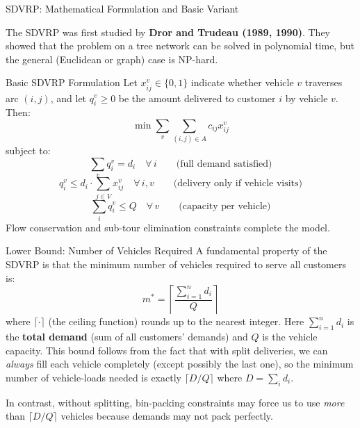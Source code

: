 \documentclass[aspectratio=169,10pt]{beamer}
\begin{document}
\begin{frame}[allowframebreaks]{SDVRP: Mathematical Formulation and Basic Variant}

The SDVRP was first studied by \textbf{Dror and Trudeau (1989, 1990)}.
They showed that the problem on a tree network can be solved in polynomial
time, but the general (Euclidean or graph) case is NP-hard.

\begin{block}{Basic SDVRP Formulation}
  Let $x_{ij}^v \in \{0,1\}$ indicate whether vehicle $v$ traverses arc
  $(i,j)$, and let $q_i^v \geq 0$ be the amount delivered to customer $i$
  by vehicle $v$.  Then:
  \[
    \min \sum_v \sum_{(i,j)\in A} c_{ij} x_{ij}^v
  \]
  subject to:
  \[
    \sum_v q_i^v = d_i \quad \forall\, i
    \qquad \text{(full demand satisfied)}
  \]
  \[
    q_i^v \leq d_i \cdot \sum_{j \in V} x_{ij}^v \quad \forall\, i, v
    \qquad \text{(delivery only if vehicle visits)}
  \]
  \[
    \sum_i q_i^v \leq Q \quad \forall\, v
    \qquad \text{(capacity per vehicle)}
  \]
  Flow conservation and sub-tour elimination constraints complete the model.
\end{block}

\framebreak

\begin{block}{Lower Bound: Number of Vehicles Required}
  A fundamental property of the SDVRP is that the minimum number of vehicles
  required to serve all customers is:
  \[
    m^* = \left\lceil \frac{\sum_{i=1}^n d_i}{Q} \right\rceil
  \]
  where $\lceil \cdot \rceil$ (the ceiling function) rounds up to the nearest
  integer.  Here $\sum_{i=1}^n d_i$ is the \textbf{total demand} (sum of
  all customers' demands) and $Q$ is the vehicle capacity.  This bound
  follows from the fact that with split deliveries, we can \emph{always}
  fill each vehicle completely (except possibly the last one), so the
  minimum number of vehicle-loads needed is exactly $\lceil D/Q \rceil$
  where $D = \sum_i d_i$.

  \medskip
  In contrast, without splitting, bin-packing constraints may force us to
  use \emph{more} than $\lceil D/Q \rceil$ vehicles because demands may not
  pack perfectly.
\end{block}


\end{frame}
\end{document}

